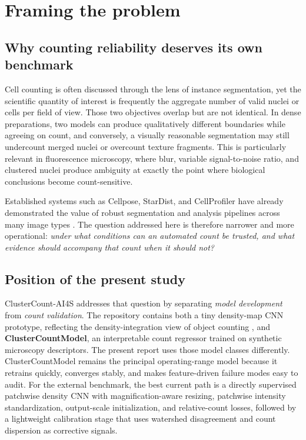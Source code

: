 \documentclass[10pt,a4paper,twocolumn]{article}
\begin{document}
\section{Framing the problem}

\subsection{Why counting reliability deserves its own benchmark}
Cell counting is often discussed through the lens of instance segmentation, yet the scientific quantity of interest is frequently the aggregate number of valid nuclei or cells per field of view. Those two objectives overlap but are not identical. In dense preparations, two models can produce qualitatively different boundaries while agreeing on count, and conversely, a visually reasonable segmentation may still undercount merged nuclei or overcount texture fragments. This is particularly relevant in fluorescence microscopy, where blur, variable signal-to-noise ratio, and clustered nuclei produce ambiguity at exactly the point where biological conclusions become count-sensitive.

Established systems such as Cellpose, StarDist, and CellProfiler have already demonstrated the value of robust segmentation and analysis pipelines across many image types \cite{cellpose,stardist,cellprofiler}. The question addressed here is therefore narrower and more operational: \emph{under what conditions can an automated count be trusted, and what evidence should accompany that count when it should not?}

\subsection{Position of the present study}
ClusterCount-AI4S addresses that question by separating \emph{model development} from \emph{count validation}. The repository contains both a tiny density-map CNN prototype, reflecting the density-integration view of object counting \cite{lempitsky}, and \textbf{ClusterCountModel}, an interpretable count regressor trained on synthetic microscopy descriptors. The present report uses those model classes differently. ClusterCountModel remains the principal operating-range model because it retrains quickly, converges stably, and makes feature-driven failure modes easy to audit. For the external benchmark, the best current path is a directly supervised patchwise density CNN with magnification-aware resizing, patchwise intensity standardization, output-scale initialization, and relative-count losses, followed by a lightweight calibration stage that uses watershed disagreement and count dispersion as corrective signals.
\end{document}
